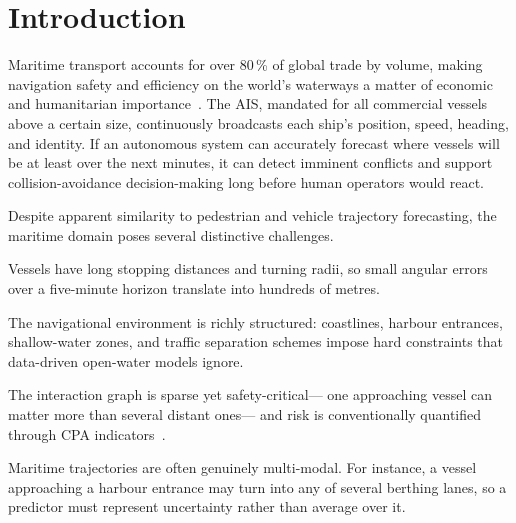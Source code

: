 \documentclass[runningheads]{preamp/llncs}
\begin{document}
\begin{abstract}
\end{abstract}
%
\section{Introduction}
\label{sec:intro}

Maritime transport accounts for over 80\,\% of global trade by volume,
making navigation
safety and efficiency
on the world's waterways a matter of
economic and humanitarian importance~\cite{development2023review}.
%
The \ac{AIS},
mandated for all commercial vessels above a certain size,
continuously broadcasts each ship's
position, speed, heading, and identity.
%
If an
autonomous system can accurately forecast where vessels will be at least over the next minutes, it can
detect imminent conflicts
and
support collision-avoidance decision-making
long before human operators would react.

Despite apparent similarity to pedestrian and vehicle trajectory forecasting,
the maritime domain poses several distinctive challenges.
\begin{enumerate*}[label=(\roman*)]
    \item Vessels have long stopping distances and turning radii,
    so small angular errors over a five-minute horizon translate into hundreds of metres.

    \item The navigational environment is richly structured:
    coastlines, harbour entrances, shallow-water zones, and traffic separation schemes
    impose hard constraints that data-driven open-water models ignore.

    \item The interaction graph is sparse yet safety-critical---%
    one approaching vessel can matter more than several distant ones---%
    and
    risk is conventionally quantified through \ac{CPA} indicators~\cite{imo1972convention}.

    \item Maritime trajectories are often genuinely multi-modal.
    For instance,
    a vessel approaching a harbour entrance may turn into any of several berthing lanes,
    so a predictor must represent uncertainty rather than average over it.
\end{enumerate*}
\end{document}

